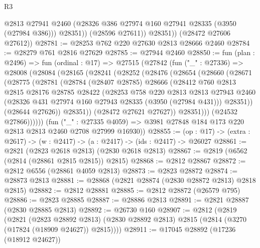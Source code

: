 \begin{lexlean}{R3}
\begin{coremodule}
                @2813
                @27941
                @2460
                (@28326 @386 @27974 @160 @27941 @28335 (@3950 (@27984 @386)))
                @28351))
            (@28596 @27611))
          @28351))
      (@28472 @27606 @27612))
@28781 := @28253 @762 @220 @27630 @2813 @28666 @2460
@28784 := @28279 @761 @2816 @27629
@28785 := @27944 @2460
@28850 := fun (plan : @2496) =>
  fun (ordinal : @17) =>
  @27515
    (@27842
      (fun ("_" : @27336) =>
      @28008
        (@28084
          (@28165
            (@28241
              (@28252
                (@28476
                  (@28654
                    (@28660
                      (@28671
                        (@28775
                          (@28781
                            (@28784
                              (@28407 @28785)
                              @28666
                              (@28412
                                @760
                                @2813
                                @2815
                                @28176
                                @28785
                                @28422
                                (@28253
                                  @758
                                  @220
                                  @2813
                                  @2813
                                  @27943
                                  @2460
                                  (@28326 @431 @27974 @160 @27943 @28335 (@3950 (@27984 @431)))
                                  @28351))
                              (@28644 @27626))
                            @28351))
                        (@28472 @27621 @27627))
                      @28351)))
                (@24532 @27866))))))
      (fun ("_" : @27335 @4059) =>
      @3981 @27848 @184 @173 @220 @2813 @2813 @2460 @2708 @27999 @16930))
@28855 := (op : @17) -> (extra : @2617) -> (w : @2417) -> (a : @2417) -> (ids : @2417) -> @26027
@28861 := @2821 (@2823 @2618 @2813) (@2830 @2618 @2813)
@28867 := @2819 (@6562 (@2814 (@28861 @2815 @2815)) @2815)
@28868 := @2812 @28867
@28872 := @2812 @6556 (@28861 @4059 @2813)
@28873 := @2823 @28872
@28874 := @28873 @2813
@28881 := @28868 (@2821 @28874 (@2830 @28872 @2813) @2818 @2815)
@28882 := @2812 @28881
@28885 := @2812 @28872 (@26579 @795)
@28886 := @2823 @28885
@28887 := @28886 @2813
@28891 := @2821 @28887 (@2830 @28885 @2813)
@28892 := @26730 @160
@28907 := @2812
    (@2819
      (@2821
        (@2823 @28892 @2813)
        (@2830 @28892 @2813)
        @2815
        (@2814 (@3270 (@17824 (@18909 @24627)) @2815))))
@28911 := @17045 @28892 (@17236 (@18912 @24627))

\end{coremodule}
\end{lexlean}
